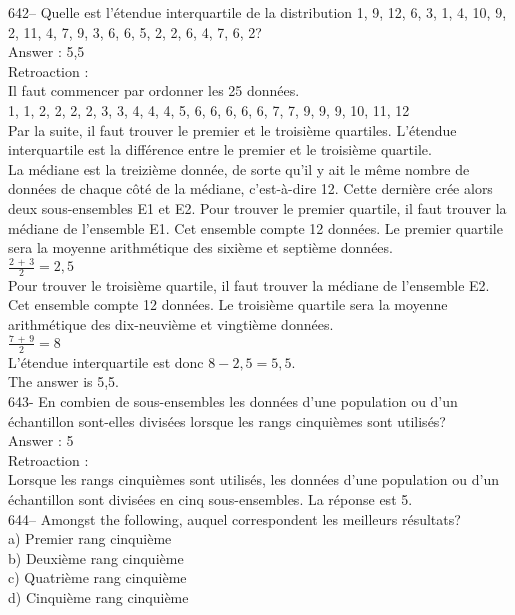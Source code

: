 ﻿\documentclass[letterpaper, 12pt]{article}
\begin{document}
642--  Quelle est l'\'etendue interquartile de la distribution 1, 9, 12, 6,
3, 1, 4, 10, 9, 2, 11, 4, 7, 9, 3, 6, 6, 5, 2, 2, 6, 4, 7, 6, 2?\\

Answer : 5,5\\

Retroaction : \\
Il faut commencer par ordonner les 25 donn\'ees.\\
1, 1, 2, 2, 2, 2, 3, 3, 4, 4, 4, 5, 6, 6, 6, 6, 6, 7, 7, 9, 9, 9, 10, 11,
12\\
Par la suite, il faut trouver le premier et le troisi\`eme quartiles.
L'\'etendue interquartile est la diff\'erence entre le premier et le
troisi\`eme quartile.\\
La m\'ediane est la treizi\`eme donn\'ee, de sorte qu'il y ait le m\^eme
nombre de donn\'ees de chaque c\^ot\'e de la m\'ediane, c'est-\`a-dire 12.
Cette derni\`ere cr\'ee alors deux sous-ensembles E1 et E2.  Pour trouver le
premier quartile, il faut trouver la m\'ediane de l'ensemble E1.  Cet
ensemble compte 12 donn\'ees.  Le premier quartile sera la moyenne
arithm\'etique des sixi\`eme et septi\`eme donn\'ees. \\[2mm]
$\frac{2\,+\,3}{2}=2,5$\\[2mm]
Pour trouver le troisi\`eme quartile, il faut trouver la m\'ediane de
l'ensemble E2.  Cet ensemble compte 12 donn\'ees.  Le troisi\`eme quartile
sera la moyenne arithm\'etique des dix-neuvi\`eme et vingti\`eme donn\'ees.
\\[2mm]
$\frac{7\,+\,9}{2}=8$\\[2mm]
L'\'etendue interquartile est donc $8-2,5=5,5$.\\[2mm]
The answer is 5,5.\\

643- En combien de sous-ensembles les donn\'ees d'une population ou d'un
\'echantillon sont-elles divis\'ees lorsque les rangs cinqui\`emes sont
utilis\'es?\\

Answer : 5\\

Retroaction : \\
Lorsque les rangs cinqui\`emes sont utilis\'es, les donn\'ees d'une
population ou d'un \'echantillon sont divis\'ees en cinq sous-ensembles.  La
r\'eponse est 5.\\

644-- Amongst the following, auquel correspondent les meilleurs
r\'esultats?\\
a) Premier rang cinqui\`eme\\
b) Deuxi\`eme rang cinqui\`eme\\
c) Quatri\`eme rang cinqui\`eme\\
d) Cinqui\`eme rang cinqui\`eme\\
\end{document}
